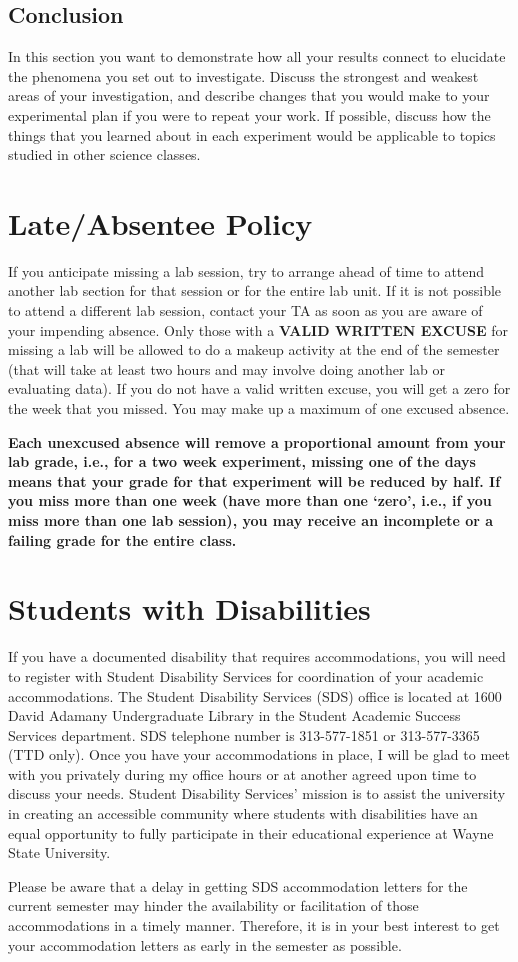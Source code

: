 \subsection*{Conclusion}
In this section you want to demonstrate how all your results connect to elucidate the phenomena you set out to investigate.
Discuss the strongest and weakest areas of your investigation, and describe changes that you would make to your experimental plan if you were to repeat your work.
If possible, discuss how the things that you learned about in each experiment would be applicable to topics studied in other science classes.

\newpage

\section*{Late/Absentee Policy}
If you anticipate missing a lab session, try to arrange ahead of time to attend another lab section for that session or for the entire lab unit.
If it is not possible to attend a different lab session, contact your TA as soon as you are aware of your impending absence.
Only those with a \textbf{VALID WRITTEN EXCUSE} for missing a lab will be allowed to do a makeup activity at the end of the semester (that will take at least two hours and may involve doing another lab or evaluating data).
If you do not have a valid written excuse, you will get a zero for the week that you missed.
You may make up a maximum of one excused absence.
\par
\textbf{Each unexcused absence will remove a proportional amount from your lab grade, i.e., for a two week experiment, missing one of the days means that your grade for that experiment will be reduced by half.
If you miss more than one week (have more than one `zero', i.e., if you miss more than one lab session), you may receive an incomplete or a failing grade for the entire class.}

\section*{Students with Disabilities}
If you have a documented disability that requires accommodations, you will need to register with Student Disability Services for coordination of your academic accommodations. 
The Student Disability Services (SDS) office is located at 1600 David Adamany Undergraduate Library in the Student Academic Success Services department. 
SDS telephone number is 313-577-1851 or 313-577-3365 (TTD only). 
Once you have your accommodations in place, I will be glad to meet with you privately during my office hours or at another agreed upon time to discuss your needs. 
Student Disability Services' mission is to assist the university in creating an accessible community where students with disabilities have an equal opportunity to fully participate in their educational experience at Wayne State University.
\par
Please be aware that a delay in getting SDS accommodation letters for the current semester may hinder the availability or facilitation of those accommodations in a timely manner.
Therefore, it is in your best interest to get your accommodation letters as early in the semester as possible.

